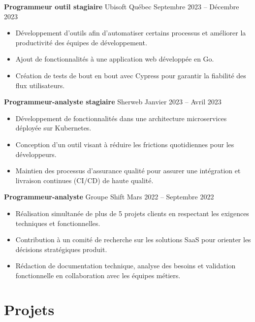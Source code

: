 \documentclass[10pt]{article}       %
\begin{document}
\textbf{Programmeur outil stagiaire} {Ubisoft Québec} \hfill Septembre 2023 -- Décembre 2023 \\
\vspace{-9pt}
\begin{itemize}
	\item Développement d'outils afin d'automatiser certains processus et améliorer la productivité des équipes de développement.
	\item Ajout de fonctionnalités à une application web développée en Go.
	\item Création de tests de bout en bout avec Cypress pour garantir la fiabilité des flux utilisateurs.
\end{itemize}

\textbf{Programmeur-analyste stagiaire} {Sherweb} \hfill Janvier 2023 -- Avril 2023 \\
\vspace{-9pt}
\begin{itemize}
	\item Développement de fonctionnalités dans une architecture microservices déployée sur Kubernetes.
	\item Conception d'un outil visant à réduire les frictions quotidiennes pour les développeurs.
	\item Maintien des processus d'assurance qualité pour assurer une intégration et livraison continues (CI/CD) de haute qualité.
\end{itemize}

\textbf{Programmeur-analyste} {Groupe Shift} \hfill Mars 2022 -- Septembre 2022 \\
\vspace{-9pt}
\begin{itemize}
	\item Réalisation simultanée de plus de 5 projets clients en respectant les exigences techniques et fonctionnelles.
	\item Contribution à un comité de recherche sur les solutions SaaS pour orienter les décisions stratégiques produit.
	\item Rédaction de documentation technique, analyse des besoins et validation fonctionnelle en collaboration avec les équipes métiers.
\end{itemize}

\vspace{-18.5pt}

\section*{Projets}
\end{document}
